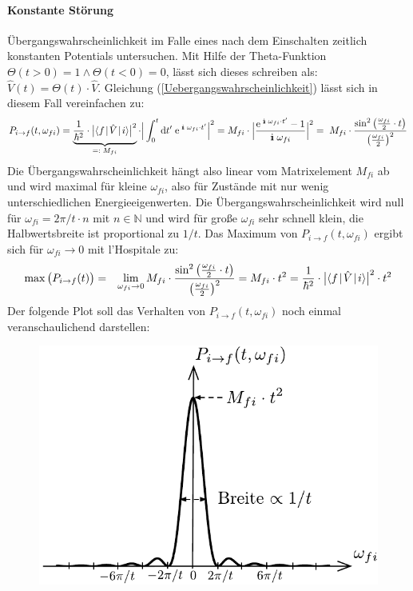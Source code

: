 \paragraph{Konstante Störung}

Übergangswahrscheinlichkeit im Falle eines nach dem Einschalten zeitlich konstanten Potentials untersuchen. Mit Hilfe der Theta-Funktion $\Theta(t>0)=1\land\Theta(t<0)=0$, lässt sich dieses schreiben als: $\hat{V}(t)=\Theta(t)\cdot\hat{V}$. Gleichung (\ref{Uebergangswahrscheinlichkeit}) lässt sich in diesem Fall vereinfachen zu:  
\begin{eqnarray*}
	P_{i\to f}(t,\omega_{fi}) = \underbrace{\frac{1}{\hbar^2}\cdot\big|\bracket{f}{\hat{V}}{i}\big|^2 }_{=:\;M_{fi}} \cdot 
	\Big|\int_0^t\mathrm{d}t'\; \e^{\;\I\;\omega_{fi}\cdot t'} \Big|^2 = M_{fi} \cdot \Big| \frac{\e^{\;\I\;\omega_{fi}\cdot t'}-1}{\I\;\omega_{fi}}\Big|^2 =\; M_{fi} \cdot\frac{\sin^2\big(\frac{\omega_{fi}}{2}\cdot t\big)}{\big(\frac{\omega_{fi}}{2}\big)^2}
\end{eqnarray*}
Die Übergangswahrscheinlichkeit hängt also linear vom Matrixelement $M_{fi}$ ab und wird maximal für kleine $\omega_{fi}$, also für Zustände mit nur wenig unterschiedlichen Energieeigenwerten. Die Übergangswahrscheinlichkeit wird null für $\omega_{fi}=2\pi/t\cdot n$ mit $n\in\mathbb{N}$ und wird für große $\omega_{fi}$ sehr schnell klein, die Halbwertsbreite ist proportional zu $1/t$. Das Maximum von $P_{i\to f}(t,\omega_{fi})$ ergibt sich für $\omega_{fi}\to0$ mit l'Hospitale zu: 
\begin{eqnarray*}
	\max\big(P_{i\to f}(t)\big) &=& \lim_{\omega_{fi}\to0}M_{fi}\cdot\frac{\sin^2\big(\frac{\omega_{fi}}{2}\cdot t\big)}{\big(\frac{\omega_{fi}}{2}\big)^2}= M_{fi}\cdot t^2 = \frac{1}{\hbar^2}\cdot\big|\bracket{f}{\hat{V}}{i}\big|^2 \cdot t^2
\end{eqnarray*}
Der folgende Plot soll das Verhalten von $P_{i\to f}(t,\omega_{fi})$ noch einmal veranschaulichend darstellen:
\vspace{-2ex}\begin{figure}[!h]\center
	\includegraphics[scale=.75]{Figs/Sin2Plot}
\end{figure}\vspace{-4ex}

